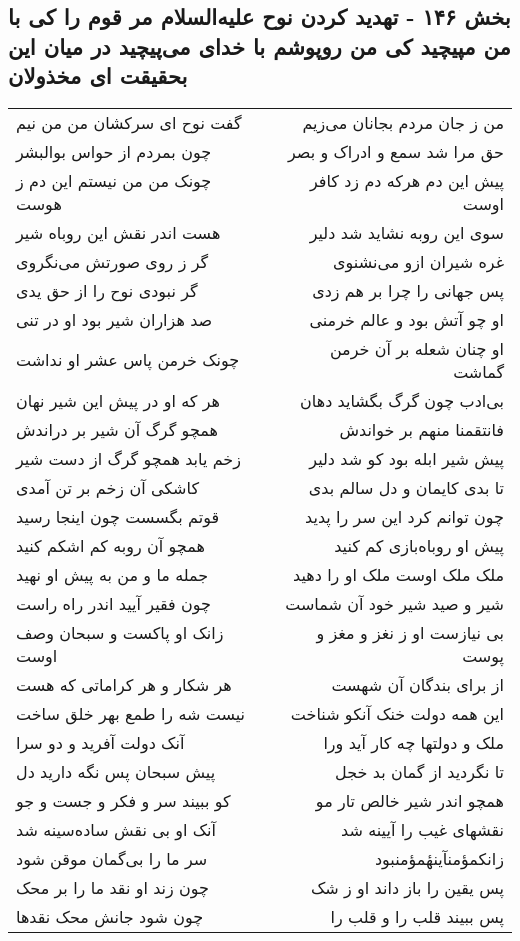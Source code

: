 \begin{center}
\section*{بخش ۱۴۶ - تهدید کردن نوح علیه‌السلام مر قوم را کی با من مپیچید کی من روپوشم با خدای می‌پیچید در میان این بحقیقت ای مخذولان}
\label{sec:sh146}
\begin{longtable}{l p{0.5cm} r}
گفت نوح ای سرکشان من من نیم
&&
من ز جان مردم بجانان می‌زیم
\\
چون بمردم از حواس بوالبشر
&&
حق مرا شد سمع و ادراک و بصر
\\
چونک من من نیستم این دم ز هوست
&&
پیش این دم هرکه دم زد کافر اوست
\\
هست اندر نقش این روباه شیر
&&
سوی این روبه نشاید شد دلیر
\\
گر ز روی صورتش می‌نگروی
&&
غره شیران ازو می‌نشنوی
\\
گر نبودی نوح را از حق یدی
&&
پس جهانی را چرا بر هم زدی
\\
صد هزاران شیر بود او در تنی
&&
او چو آتش بود و عالم خرمنی
\\
چونک خرمن پاس عشر او نداشت
&&
او چنان شعله بر آن خرمن گماشت
\\
هر که او در پیش این شیر نهان
&&
بی‌ادب چون گرگ بگشاید دهان
\\
همچو گرگ آن شیر بر دراندش
&&
فانتقمنا منهم بر خواندش
\\
زخم یابد همچو گرگ از دست شیر
&&
پیش شیر ابله بود کو شد دلیر
\\
کاشکی آن زخم بر تن آمدی
&&
تا بدی کایمان و دل سالم بدی
\\
قوتم بگسست چون اینجا رسید
&&
چون توانم کرد این سر را پدید
\\
همچو آن روبه کم اشکم کنید
&&
پیش او روباه‌بازی کم کنید
\\
جمله ما و من به پیش او نهید
&&
ملک ملک اوست ملک او را دهید
\\
چون فقیر آیید اندر راه راست
&&
شیر و صید شیر خود آن شماست
\\
زانک او پاکست و سبحان وصف اوست
&&
بی نیازست او ز نغز و مغز و پوست
\\
هر شکار و هر کراماتی که هست
&&
از برای بندگان آن شهست
\\
نیست شه را طمع بهر خلق ساخت
&&
این همه دولت خنک آنکو شناخت
\\
آنک دولت آفرید و دو سرا
&&
ملک و دولتها چه کار آید ورا
\\
پیش سبحان پس نگه دارید دل
&&
تا نگردید از گمان بد خجل
\\
کو ببیند سر و فکر و جست و جو
&&
همچو اندر شیر خالص تار مو
\\
آنک او بی نقش ساده‌سینه شد
&&
نقشهای غیب را آیینه شد
\\
سر ما را بی‌گمان موقن شود
&&
زانکمؤمنآینهٔمؤمنبود
\\
چون زند او نقد ما را بر محک
&&
پس یقین را باز داند او ز شک
\\
چون شود جانش محک نقدها
&&
پس ببیند قلب را و قلب را
\\
\end{longtable}
\end{center}
